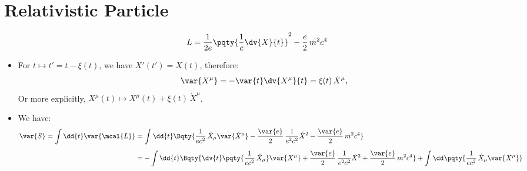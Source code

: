 \documentclass[a4paper,10pt]{article}
\begin{document}
\section{Relativistic Particle}
	\vspace{-.3\baselineskip}
	\begin{equation}
		L = \frac{1}{2e} \pqty{
			\frac{1}{c}\dv{X}{t}
		}^2 - \frac{e}{2}\,m^2 c^4
	\end{equation}
	\begin{itemize}
	\item For $t\mapsto t' = t - \xi(t)$, we have $
		X'(t') = X(t)
	$, therefore:
	\begin{equation}
		\var{X^\mu}
		= -\var{t} \dv{X^\mu}{t}
		= \xi(t)\,\dot{X}^\mu,
	\end{equation}
	Or more explicitly, $
		X^\mu(t)
		\mapsto X^\mu(t) + \xi(t)\,\dot{X}^\mu
	$. 
	
	\item We have:
	\begin{equation}
	\begin{aligned}
		\var{S}
		= \int\dd{t} \var{\mcal{L}}
		&= \int\dd{t} \Bqty{
			\frac{1}{ec^2}\,
				\dot{X}_\mu
				\var{\dot{X}^\mu}
			- \frac{\var{e}}{2}\,
				\frac{1}{e^2 c^2} \dot{X}^2
			- \frac{\var{e}}{2}\,m^2 c^4
		} \\[1ex]
		&= - \int\dd{t} \Bqty{
			\dv{t} \pqty{
				\frac{1}{ec^2}\,
				\dot{X}_\mu
			} \var{X^\mu}
			+ \frac{\var{e}}{2}\,
				\frac{1}{e^2 c^2} \dot{X}^2
			+ \frac{\var{e}}{2}\,m^2 c^4
		} + \int \dd\mspace{.5mu}\pqty{
			\frac{1}{ec^2}\,
				\dot{X}_\mu
				\var{X^\mu}
		} \\
	\end{aligned}
	\end{equation}
	\end{itemize}
	
	
	
	
	
	
	
	\legacyReference
	
\end{document}
